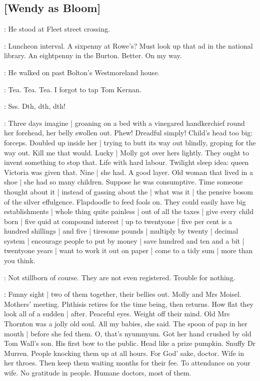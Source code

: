 \subsection{[Wendy as Bloom]}

:
He stood at Fleet street crossing.

\BloomInt:
Luncheon interval.
A sixpenny at Rowe's?
Must look up that ad in the national library.
An eightpenny in the Burton.
Better.
On my way.

:
He walked on past Bolton's Westmoreland house.

\BloomInt:
Tea.
Tea.
Tea.
I forgot to tap Tom Kernan.

\Bloom:
Sss.
Dth, dth, dth!

\BloomInt:
Three days imagine |
groaning on a bed with a vinegared handkerchief round her forehead,
her belly swollen out.
Phew!
Dreadful simply!
Child's head too big:
forceps.
Doubled up inside her |
trying to butt its way out blindly,
groping for the way out.
Kill me that would.
Lucky |
Molly got over hers lightly.
They ought to invent something to stop that.
Life with hard labour.
Twilight sleep idea:
queen Victoria was given that.
Nine |
she had.
A good layer.
Old woman that lived in a shoe |
she had so many children.
Suppose he was consumptive.
Time someone thought about it |
instead of gassing about the |
what was it |
the pensive bosom of the silver effulgence.
Flapdoodle to feed fools on.
They could easily have big establishments |
whole thing quite painless |
out of all the taxes |
give every child born |
five quid at compound interest |
up to twentyone |
five per cent is a hundred shillings |
and five |
tiresome pounds |
multiply by twenty |
decimal system |
encourage people to put by money |
save hundred and ten and a bit |
twentyone years |
want to work it out on paper |
come to a tidy sum |
more than you think.

\BloomInt:
Not stillborn of course.
They are not even registered.
Trouble for nothing.%

\BloomInt:
Funny sight |
two of them together,
their bellies out.
Molly and Mrs Moisel.
Mothers' meeting.
Phthisis retires for the time being,
then returns.
How flat they look all of a sudden |
after.
Peaceful eyes.
Weight off their mind.
Old Mrs Thornton was a jolly old soul.
All my babies,
she said.
The spoon of pap in her mouth |
before she fed them.
O, that's nyumnyum.
Got her hand crushed by old Tom Wall's son.
His first bow to the public.
Head like a prize pumpkin.
Snuffy Dr Murren.
People knocking them up at all hours.
For God' sake, doctor.
Wife in her throes.
Then keep them waiting months for their fee.
To attendance on your wife.
No gratitude in people.
Humane doctors,
most of them.


